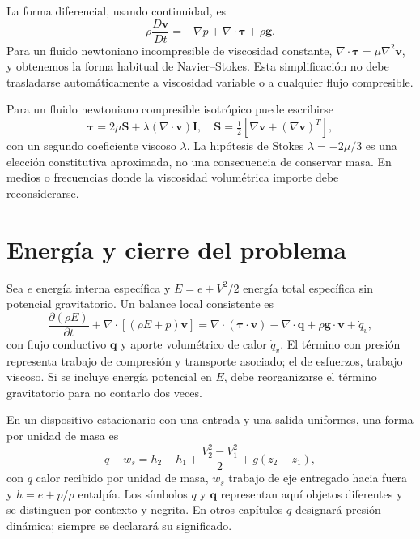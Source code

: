 La forma diferencial, usando continuidad, es
\begin{equation}\label{eq:07-NS}
 \rho\frac{D\boldsymbol{v}}{Dt}=-\nabla p+\nabla\cdot\boldsymbol{\tau}+\rho\boldsymbol{g}.
\end{equation}
Para un fluido newtoniano incompresible de viscosidad constante, $\nabla\cdot\boldsymbol{\tau}=\mu\nabla^2\boldsymbol{v}$, y obtenemos la forma habitual de Navier--Stokes. Esta simplificación no debe trasladarse automáticamente a viscosidad variable o a cualquier flujo compresible.

Para un fluido newtoniano compresible isotrópico puede escribirse
\begin{equation}
 \boldsymbol{\tau}=2\mu\boldsymbol{S}+\lambda(\nabla\cdot\boldsymbol{v})\boldsymbol{I},\quad
 \boldsymbol{S}=\tfrac12[\nabla\boldsymbol{v}+(\nabla\boldsymbol{v})^{T}],
\end{equation}
con un segundo coeficiente viscoso $\lambda$. La hipótesis de Stokes $\lambda=-2\mu/3$ es una elección constitutiva aproximada, no una consecuencia de conservar masa. En medios o frecuencias donde la viscosidad volumétrica importe debe reconsiderarse.

\section{Energía y cierre del problema}
Sea $e$ energía interna específica y $E=e+V^2/2$ energía total específica sin potencial gravitatorio. Un balance local consistente es
\begin{equation}\label{eq:07-energia}
 \frac{\partial(\rho E)}{\partial t}+
 \nabla\cdot[(\rho E+p)\boldsymbol{v}]
 =\nabla\cdot(\boldsymbol{\tau}\cdot\boldsymbol{v})-
 \nabla\cdot\boldsymbol{q}+\rho\boldsymbol{g}\cdot\boldsymbol{v}+\dot q_v,
\end{equation}
con flujo conductivo $\boldsymbol{q}$ y aporte volumétrico de calor $\dot q_v$. El término con presión representa trabajo de compresión y transporte asociado; el de esfuerzos, trabajo viscoso. Si se incluye energía potencial en $E$, debe reorganizarse el término gravitatorio para no contarlo dos veces.

En un dispositivo estacionario con una entrada y una salida uniformes, una forma por unidad de masa es
\begin{equation}\label{eq:07-energia-1d}
 q-w_s=h_2-h_1+\frac{V_2^2-V_1^2}{2}+g(z_2-z_1),
\end{equation}
con $q$ calor recibido por unidad de masa, $w_s$ trabajo de eje entregado hacia fuera y $h=e+p/\rho$ entalpía. Los símbolos $q$ y $\boldsymbol{q}$ representan aquí objetos diferentes y se distinguen por contexto y negrita. En otros capítulos $q$ designará presión dinámica; siempre se declarará su significado.

